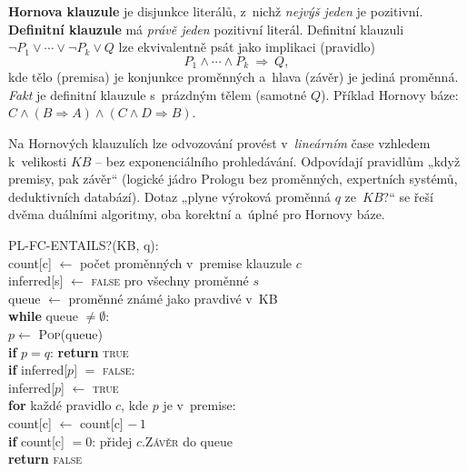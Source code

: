 \begin{definice}
\textbf{Hornova klauzule} je disjunkce literálů, z~nichž \emph{nejvýš jeden} je pozitivní. \textbf{Definitní klauzule} má \emph{právě jeden} pozitivní literál. Definitní klauzuli $\neg P_1\vee\cdots\vee\neg P_k\vee Q$ lze ekvivalentně psát jako implikaci (pravidlo)
\[ P_1\wedge\cdots\wedge P_k\ \Rightarrow\ Q, \]
kde tělo (premisa) je konjunkce proměnných a~hlava (závěr) je jediná proměnná. \emph{Fakt} je definitní klauzule s~prázdným tělem (samotné $Q$). Příklad Hornovy báze: $C\wedge(B\Rightarrow A)\wedge(C\wedge D\Rightarrow B)$.
\end{definice}

\begin{intuice}
Na Hornových klauzulích lze odvozování provést v~\emph{lineárním} čase vzhledem k~velikosti $KB$ -- bez exponenciálního prohledávání. Odpovídají pravidlům „když premisy, pak závěr`` (logické jádro Prologu bez proměnných, expertních systémů, deduktivních databází). Dotaz „plyne výroková proměnná $q$ ze~$KB$?“ se řeší dvěma duálními algoritmy, oba korektní a~úplné pro Hornovy báze.
\end{intuice}

\begin{algo}
\ttfamily\small
PL-FC-ENTAILS?(KB, q):\\
\hspace*{1.5em}count[c] $\leftarrow$ počet proměnných v~premise klauzule $c$ \\
\hspace*{1.5em}inferred[s] $\leftarrow$ \textsc{false} pro všechny proměnné $s$\\
\hspace*{1.5em}queue $\leftarrow$ proměnné známé jako pravdivé v~KB \\
\hspace*{1.5em}\textbf{while} queue $\neq\emptyset$:\\
\hspace*{3em}$p\leftarrow$ \textsc{Pop}(queue)\\
\hspace*{3em}\textbf{if} $p=q$: \textbf{return} \textsc{true} \\
\hspace*{3em}\textbf{if} inferred[$p$] $=$ \textsc{false}:\\
\hspace*{4.5em}inferred[$p$] $\leftarrow$ \textsc{true}\\
\hspace*{4.5em}\textbf{for} každé pravidlo $c$, kde $p$ je v~premise:\\
\hspace*{6em}count[c] $\leftarrow$ count[c] $-\,1$ \\
\hspace*{6em}\textbf{if} count[c] $=0$: přidej $c$.\textsc{Závěr} do queue \\
\hspace*{1.5em}\textbf{return} \textsc{false}
\end{algo}

